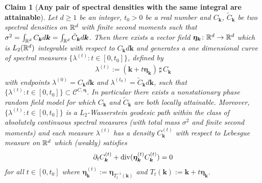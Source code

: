 \documentclass[10pt,noinfoline]{imsart}
\newtheorem{claim}{Claim}
\newcommand{\bs}{\boldsymbol}
\begin{document}
\begin{claim}[\textbf{Any pair of spectral densities with the same integral are attainable}]
\label{claim any two spec are attainable}
Let $d\geq 1$ be an integer, $t_0 > 0$ be a real number and $C_{\bs k}$, $\tilde C_{\bs k}$ be two spectral densities on $\Bbb R^d$ with finite second moments such that $\sigma^2 = \int_{\Bbb R^d}  C_{\bs k}d\bs k = \int_{\Bbb R^d} \tilde C_{\bs k}d\bs k$. Then there exists a vector field $\bs \eta_{\bs k}\colon \Bbb R^d \rightarrow \Bbb R^d$ which is $L_2(\Bbb R^d)$ integrable with respect to $C_{\bs k}d\bs k$ and  generates a one dimensional curve of spectral measures  $\{\lambda^{(t)}: t\in [0,t_0]\}$, defined by 
\begin{align}
\lambda^{(t)} := (\bs k + t\bs \eta_{\bs k})\,\sharp\, C_{\bs k}
\end{align}
with endpoints $\lambda^{(0)}=C_{\bs k}d\bs k$ and $\lambda^{(t_0)}=\tilde C_{\bs k}d\bs k$,
such that  $\{\lambda^{(t)}:t\in[0,t_0] \}\subset \mathscr C^{C,\bs\eta}$. In particular there exists a nonstationary phase random field model for which  $C_{\bs k}$ and $\tilde C_{\bs k}$ are both locally attainable.
Moreover,  $\{\lambda^{(t)}: t\in [0,t_0]\}$ is a $L_2$-Wasserstein geodesic path within the class of absolutely continuous spectral measures (with total mass $\sigma^2$ and finite second moments) and each measure $\lambda^{(t)}$ has a density $C^{(t)}_{\bs k}$ with respect to Lebesgue measure on $\Bbb R^d$ which (weakly) satisfies 
\begin{align}
\label{div flow for geo}
\partial_t C^{(t)}_{\bs k} +\text{\rm div}(\bs \eta^{(t)}_{\bs k}C^{(t)}_{\bs k}) = 0
\end{align}
for all $t\in [0,t_0]$ where $\bs \eta^{(t)}_{\bs k}:=\bs \eta_{T_t^{-1}(\bs k)}$ and $T_t(\bs k):= \bs k + t\bs \eta_{\bs k}$.
\end{claim}
\end{document}
